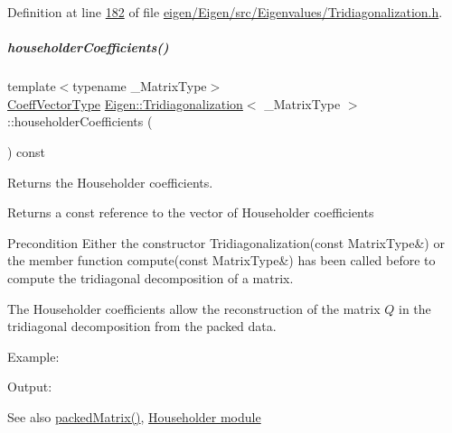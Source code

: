Definition at line \hyperlink{eigen_2_eigen_2src_2_eigenvalues_2_tridiagonalization_8h_source_l00182}{182} of file \hyperlink{eigen_2_eigen_2src_2_eigenvalues_2_tridiagonalization_8h_source}{eigen/\+Eigen/src/\+Eigenvalues/\+Tridiagonalization.\+h}.

\mbox{\label{group___eigenvalues___module_ac95b4e43dcf6c3c5074b8bea4fc67887}} 
\subparagraph{\texorpdfstring{householder\+Coefficients()}{householderCoefficients()}\hspace{0.1cm}{\footnotesize\ttfamily [2/2]}}
{\footnotesize\ttfamily template$<$typename \+\_\+\+Matrix\+Type$>$ \\
\hyperlink{group___core___module}{Coeff\+Vector\+Type} \hyperlink{group___eigenvalues___module_class_eigen_1_1_tridiagonalization}{Eigen\+::\+Tridiagonalization}$<$ \+\_\+\+Matrix\+Type $>$\+::householder\+Coefficients (\begin{DoxyParamCaption}{ }\end{DoxyParamCaption}) const\hspace{0.3cm}{\ttfamily [inline]}}



Returns the Householder coefficients. 

\begin{DoxyReturn}{Returns}
a const reference to the vector of Householder coefficients
\end{DoxyReturn}
\begin{DoxyPrecond}{Precondition}
Either the constructor Tridiagonalization(const Matrix\+Type\&) or the member function compute(const Matrix\+Type\&) has been called before to compute the tridiagonal decomposition of a matrix.
\end{DoxyPrecond}
The Householder coefficients allow the reconstruction of the matrix $ Q $ in the tridiagonal decomposition from the packed data.

Example\+: 
\begin{DoxyCodeInclude}
\end{DoxyCodeInclude}
 Output\+: 
\begin{DoxyVerbInclude}
\end{DoxyVerbInclude}


\begin{DoxySeeAlso}{See also}
\hyperlink{group___eigenvalues___module_a47858b3895e64acafb1bb2e97f98a154}{packed\+Matrix()}, \hyperlink{group___householder___module}{Householder module} 
\end{DoxySeeAlso}


